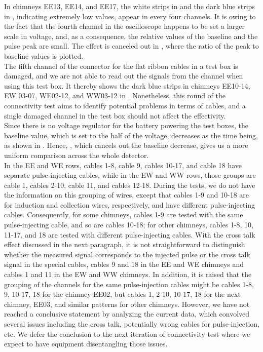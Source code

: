 In chimneys EE13, EE14, and EE17, the white strips in  
and the dark blue strips in ,
indicating extremely low values,
appear in every four channels.
It is owing to the fact that the fourth channel in the oscilloscope
happens to be set a larger scale in voltage, and, as a consequence, 
the relative values of the baseline and the pulse peak are small.
The effect is canceled out in , where the
ratio of the peak to baseline values is plotted.\\

The fifth channel of the connector for the flat ribbon cables in a test
box is damaged, and we are not able to read out the signals from the
channel when using this test box.
It thereby shows the dark blue strips in chimneys EE10-14, EW 03-07,
WE02-12, and WW03-12 in .
Nonetheless, this round of the connectivity test aims to identify
potential problems in terms of cables, and a single damaged channel
in the test box should not affect the effectivity.\\

Since there is no voltage regulator for the battery powering the test
boxes, the baseline value, which is set to the half of the voltage,
decreases as the time being, as shown in .
Hence, , which cancels out the baseline
decrease, gives us a more uniform comparison across the whole detector.\\

In the EE and WE rows, cables 1-8, cable 9, cables 10-17, and cable 18
have separate pulse-injecting cables, while in the EW and WW rows, those
groups are cable 1, cables 2-10, cable 11, and cables 12-18.
During the tests, we do not have the information on this grouping of
wires, except that cables 1-9 and 10-18 are for induction and collection
wires, respectively, and have different pulse-injecting cables.
Consequently, for some chimneys, cables 1-9 are tested with
the same pulse-injecting cable, and so are cables 10-18; 
for other chimneys, cables 1-8, 10, 11-17, and 18 are tested with different
pulse-injecting cables.
With the cross talk effect discussed in the next paragraph,
it is not straightforward to distinguish whether the measured signal
corresponds to the injected pulse or the cross talk signal in the special
cables, cables 9 and 18 in the EE and WE chimneys and cables 1 and 11
in the EW and WW chimneys.
In addition, it is raised that the grouping of the channels for the same
pulse-injection cables might be cables 1-8, 9, 10-17, 18 for the chimney
EE02, but cables 1, 2-10, 10-17, 18 for the next chimney, EE03, and
similar patterns for other chimneys.
However, we have not reached a conclusive statement by analyzing the
current data, which convolved several issues including the cross talk,
potentially wrong cables for pulse-injection, etc.
We defer the conclusion to the next iteration of connectivity test
where we expect to have equipment disentangling those issues.\\

